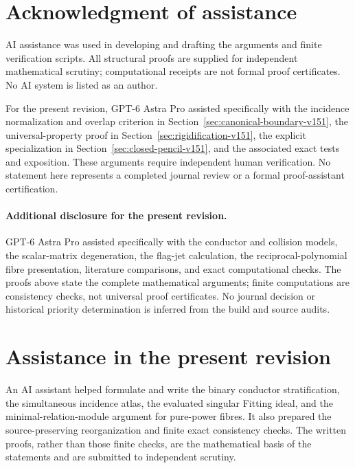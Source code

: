 \documentclass[11pt,reqno]{amsart}
\numberwithin{equation}{section}
\theoremstyle{definition}\newtheorem{definition}[theorem]{Definition}
\theoremstyle{remark}\newtheorem{remark}[theorem]{Remark}
\begin{document}

\section*{Acknowledgment of assistance}
AI assistance was used in developing and drafting the arguments and
finite verification scripts.  All structural proofs are supplied for
independent mathematical scrutiny; computational receipts are not
formal proof certificates.  No AI system is listed as an author.

For the present revision, GPT-6 Astra Pro assisted specifically with the
incidence normalization and overlap criterion in
Section~\ref{sec:canonical-boundary-v151}, the universal-property proof
in Section~\ref{sec:rigidification-v151}, the explicit specialization
in Section~\ref{sec:closed-pencil-v151}, and the associated exact tests
and exposition.  These arguments require independent human verification.
No statement here represents a completed journal review or a formal
proof-assistant certification.

\paragraph{Additional disclosure for the present revision.}
GPT-6 Astra Pro assisted specifically with the conductor and collision
models, the scalar-matrix degeneration, the flag-jet calculation,
the reciprocal-polynomial fibre presentation, literature comparisons,
and exact computational checks.  The proofs above state the complete
mathematical arguments; finite computations are consistency checks,
not universal proof certificates.  No journal decision or historical
priority determination is inferred from the build and source audits.

\section*{Assistance in the present revision}
An AI assistant helped formulate and write the binary conductor stratification,
the simultaneous incidence atlas, the evaluated singular Fitting ideal, and
the minimal-relation-module argument for pure-power fibres. It also prepared
the source-preserving reorganization and finite exact consistency checks.
The written proofs, rather than those finite checks, are the mathematical
basis of the statements and are submitted to independent scrutiny.
\end{document}
